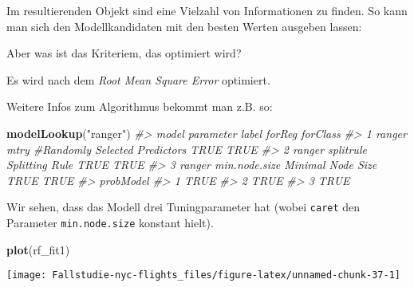 \documentclass[]{article}
\newenvironment{Shaded}{\begin{snugshade}}{\end{snugshade}}
\newcommand{\CommentTok}[1]{\textcolor[rgb]{0.56,0.35,0.01}{\textit{#1}}}
\newcommand{\KeywordTok}[1]{\textcolor[rgb]{0.13,0.29,0.53}{\textbf{#1}}}
\newcommand{\NormalTok}[1]{#1}
\newcommand{\OperatorTok}[1]{\textcolor[rgb]{0.81,0.36,0.00}{\textbf{#1}}}
\newcommand{\StringTok}[1]{\textcolor[rgb]{0.31,0.60,0.02}{#1}}
\begin{document}
Im resultierenden Objekt sind eine Vielzahl von Informationen zu finden.
So kann man sich den Modellkandidaten mit den besten Werten ausgeben
lassen:

\begin{Shaded}
\end{Shaded}

Aber was ist das Kriteriem, das optimiert wird?

\begin{Shaded}
\end{Shaded}

Es wird nach dem \emph{Root Mean Square Error} optimiert.

Weitere Infos zum Algorithmus bekommt man z.B. so:

\begin{Shaded}
\begin{Highlighting}[]
\KeywordTok{modelLookup}\NormalTok{(}\StringTok{"ranger"}\NormalTok{)}
\CommentTok{#>    model     parameter                         label forReg forClass}
\CommentTok{#> 1 ranger          mtry #Randomly Selected Predictors   TRUE     TRUE}
\CommentTok{#> 2 ranger     splitrule                Splitting Rule   TRUE     TRUE}
\CommentTok{#> 3 ranger min.node.size             Minimal Node Size   TRUE     TRUE}
\CommentTok{#>   probModel}
\CommentTok{#> 1      TRUE}
\CommentTok{#> 2      TRUE}
\CommentTok{#> 3      TRUE}
\end{Highlighting}
\end{Shaded}

Wir sehen, dass das Modell drei Tuningparameter hat (wobei
\texttt{caret} den Parameter \texttt{min.node.size} konstant hielt).

\begin{Shaded}
\begin{Highlighting}[]
\KeywordTok{plot}\NormalTok{(rf_fit1)}
\end{Highlighting}
\end{Shaded}

\begin{center}\texttt{[image: Fallstudie-nyc-flights\_files/figure-latex/unnamed-chunk-37-1]} \end{center}
\end{document}
